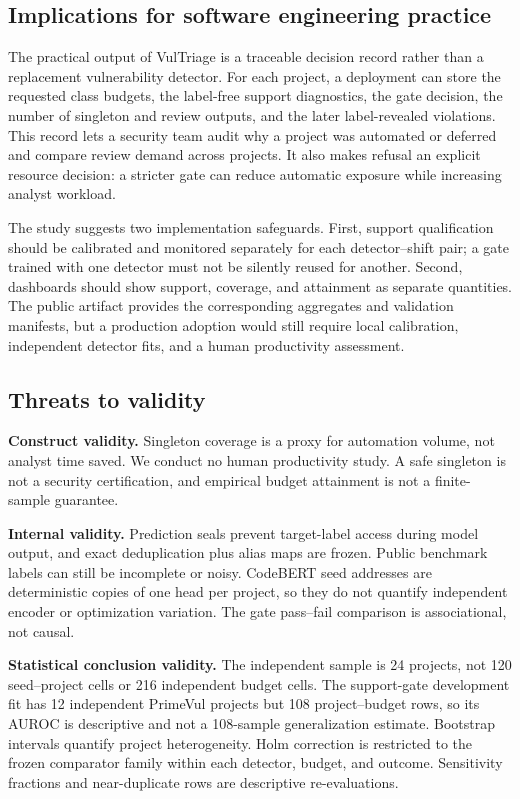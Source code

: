 \documentclass[preprint,12pt]{elsarticle}
\newcommand{\method}{VulTriage\xspace}
\begin{document}
\subsection{Implications for software engineering practice}

The practical output of \method is a traceable decision record rather than a replacement vulnerability detector. For each project, a deployment can store the requested class budgets, the label-free support diagnostics, the gate decision, the number of singleton and review outputs, and the later label-revealed violations. This record lets a security team audit why a project was automated or deferred and compare review demand across projects. It also makes refusal an explicit resource decision: a stricter gate can reduce automatic exposure while increasing analyst workload.

The study suggests two implementation safeguards. First, support qualification should be calibrated and monitored separately for each detector--shift pair; a gate trained with one detector must not be silently reused for another. Second, dashboards should show support, coverage, and attainment as separate quantities. The public artifact provides the corresponding aggregates and validation manifests, but a production adoption would still require local calibration, independent detector fits, and a human productivity assessment.

\subsection{Threats to validity}

\textbf{Construct validity.} Singleton coverage is a proxy for automation volume, not analyst time saved. We conduct no human productivity study. A safe singleton is not a security certification, and empirical budget attainment is not a finite-sample guarantee.

\textbf{Internal validity.} Prediction seals prevent target-label access during model output, and exact deduplication plus alias maps are frozen. Public benchmark labels can still be incomplete or noisy. CodeBERT seed addresses are deterministic copies of one head per project, so they do not quantify independent encoder or optimization variation. The gate pass--fail comparison is associational, not causal.

\textbf{Statistical conclusion validity.} The independent sample is 24 projects, not 120 seed--project cells or 216 independent budget cells. The support-gate development fit has 12 independent PrimeVul projects but 108 project--budget rows, so its AUROC is descriptive and not a 108-sample generalization estimate. Bootstrap intervals quantify project heterogeneity. Holm correction is restricted to the frozen comparator family within each detector, budget, and outcome. Sensitivity fractions and near-duplicate rows are descriptive re-evaluations.
\end{document}
